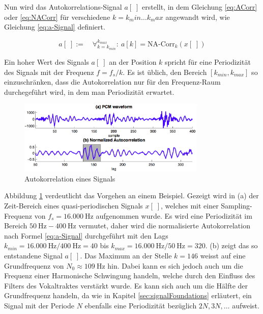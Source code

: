 Nun wird das Autokorrelations-Signal $a[\;]$ erstellt, in dem Gleichung \ref{eq:ACorr} oder \ref{eq:NACorr} für verschiedene $k = k_min \ldots k_max$ angewandt wird, wie Gleichung \ref{eq:a-Signal} definiert. 

\begin{equation}
a[\;] := \quad \mathop{\forall}_{k = k_{min}}^{k_{max}} :\ a[k] = \text{NA-Corr}_k(x[\;]) 
\label{eq:a-Signal}
\end{equation}

Ein hoher Wert des Signals $a[\;]$ an der Position $k$ spricht für eine Periodizität des Signals mit der Frequenz $f =  f_s / k $. Es ist üblich, den Bereich $[k_{min},k_{max}]$ so einzuschränken, dass die Autokorrelation nur für den Frequenz-Raum durchegeführt wird, in dem man Periodizität erwartet. 

\begin{figure}[h!]
	\centering
	\includegraphics[width=0.8\textwidth]{bilder/acorr.png}
	\caption{Autokorrelation eines Signals \cite{vad_Lisboa}}
	\label{img:acorr}
\end{figure}	

Abbildung \ref{img:acorr} verdeutlicht das Vorgehen an einem Beispiel. Gezeigt wird  in (a) der Zeit-Bereich eines quasi-periodischen Signals $x[\;]$, welches mit einer Sampling-Frequenz von $f_s = \SI{16.000}{\hertz}$ aufgenommen wurde. Es wird eine Periodizität im Bereich $\SI{50}{\hertz} - \SI{400}{\hertz}$ vermutet, daher wird die normalisierte Autokorrelation nach Formel \ref{eq:a-Signal} durchgeführt mit den Lags $k_{min} = \SI{16.000}{\hertz} / \SI{400}{\hertz} = 40$ bis $k_{max} = \SI{16.000}{\hertz} / \SI{50}{\hertz} = 320$. (b) zeigt das so entstandene Signal $a[\;]$. Das Maximum an der Stelle $k = 146$ weisst auf eine Grundfrequenz von $N_0 \approx \SI{109}{\hertz}$ hin. Dabei kann es sich jedoch auch um die Frequenz einer Harmonische Schwingung handeln, welche durch den Einfluss des Filters des Vokaltraktes verstärkt wurde. Es kann sich auch um die Hälfte der Grundfrequenz handeln, da wie in Kapitel \ref{sec:signalFoundations} erläutert, ein Signal mit der Periode $N$ ebenfalls eine Periodizität bezüglich $2N, 3N,\ldots$ aufweist. \cite{vad_Lisboa} \cite[S. 24]{dspMichigan}

